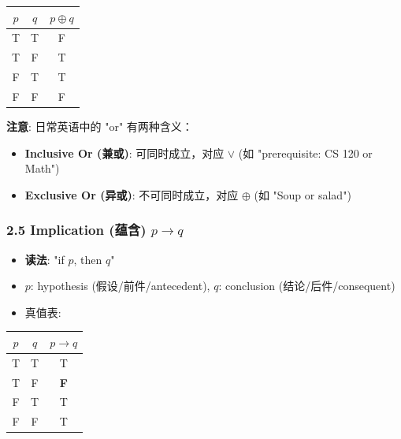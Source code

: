 \documentclass[10pt,a4paper,openany]{ctexbook}
\theoremstyle{definition}
\theoremstyle{remark}
\begin{document}
\begin{center}
\begin{tabular}{ccc}
\hline
$p$ & $q$ & $p \oplus q$ \\ \hline
T & T & F \\
T & F & T \\
F & T & T \\
F & F & F \\
\hline
\end{tabular}

\end{center}

\textbf{注意}: 日常英语中的 "or" 有两种含义：
\begin{itemize}
\item \textbf{Inclusive Or (兼或)}: 可同时成立，对应 $\lor$ (如 "prerequisite: CS 120 or Math")
\item \textbf{Exclusive Or (异或)}: 不可同时成立，对应 $\oplus$ (如 "Soup or salad")

\end{itemize}

\vspace{-2pt}

\subsubsection{2.5 Implication (蕴含) $p \to q$}

\begin{itemize}
\item \textbf{读法}: "if $p$, then $q$"
\item $p$: hypothesis (假设/前件/antecedent), $q$: conclusion (结论/后件/consequent)
\item 真值表:

\end{itemize}

\begin{center}
\begin{tabular}{ccc}
\hline
$p$ & $q$ & $p \to q$ \\ \hline
T & T & T \\
T & F & \textbf{F} \\
F & T & T \\
F & F & T \\
\hline
\end{tabular}

\end{center}
\end{document}

